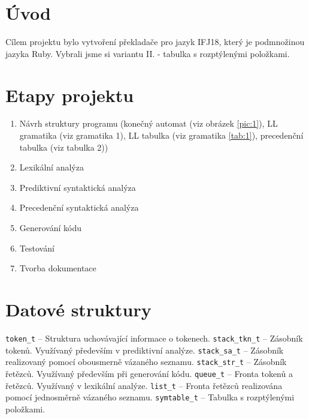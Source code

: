 \documentclass[11pt, a4paper]{article}
\begin{document}
\section{Úvod}
Cílem projektu bylo vytvoření překladače pro jazyk IFJ18, který je podmnožinou jazyka Ruby. Vybrali jsme si variantu II. - tabulka s rozptýlenými položkami.

\section{Etapy projektu}
\begin{enumerate}
  \item Návrh struktury programu (konečný automat (viz obrázek \ref{pic:1}), LL gramatika (viz gramatika 1), LL tabulka (viz gramatika \ref{tab:1}), precedenční tabulka (viz tabulka 2))
  \vspace{-0.6em}
  \item Lexikální analýza
  \vspace{-0.6em}
  \item Prediktivní syntaktická analýza 
  \vspace{-0.6em}
  \item Precedenční syntaktická analýza 
  \vspace{-0.6em}
  \item Generování kódu
  \vspace{-0.6em}
  \item Testování
  \vspace{-0.6em}
  \item Tvorba dokumentace
  \vspace{-0.6em}
\end{enumerate}


\section{Datové struktury}
\noindent
\verb|token_t| -- Struktura uchovávající informace o tokenech. \newline
\verb|stack_tkn_t| -- Zásobník tokenů. Využívaný především v prediktivní analýze. \newline
\verb|stack_sa_t| -- Zásobník realizovaný pomocí obousmerně vázaného seznamu. \newline
\verb|stack_str_t| -- Zásobník řetězců. Využívaný především při generování kódu. \newline
\verb|queue_t| -- Fronta tokenů a řetězců. Využívaný v lexikální analýze.\newline
\verb|list_t| -- Fronta řetězců realizována pomocí jednosměrně vázaného seznamu.\newline
\verb|symtable_t| -- Tabulka s rozptýlenými položkami.\newline
\end{document}
